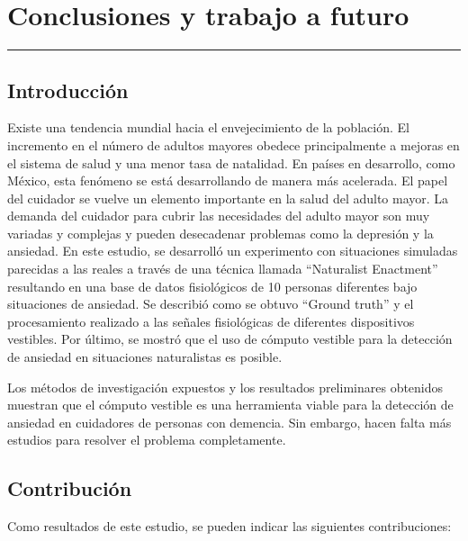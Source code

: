 
\chapter{Conclusiones y trabajo a futuro}\label{capit:cap5}
\vspace{-2.0325ex}%
\noindent
\rule{\textwidth}{0.5pt}
\vspace{-5.5ex}%
\newcommand{\pushline}{\Indp}%

\section{Introducci\'on}
	Existe una tendencia mundial hacia el envejecimiento de la población. El incremento en el n\'umero de adultos mayores obedece principalmente a mejoras en el sistema de salud y una menor tasa de natalidad. En países en desarrollo, como M\'exico, esta fenómeno se está desarrollando de manera más acelerada. El papel del cuidador se vuelve un elemento importante en la salud del adulto mayor. La demanda del cuidador para cubrir las necesidades del adulto mayor son muy variadas y complejas y pueden desecadenar problemas como la depresi\'on y la ansiedad.
En este estudio, se desarroll\'o un experimento con situaciones simuladas parecidas a las reales a trav\'es de una t\'ecnica llamada ``Naturalist Enactment'' resultando en una base de datos fisiol\'ogicos de 10 personas diferentes bajo situaciones de ansiedad. Se describi\'o como se obtuvo ``Ground truth'' y el procesamiento realizado a las se\~nales fisiol\'ogicas de diferentes dispositivos vestibles. Por \'ultimo, se mostr\'o que el uso de c\'omputo vestible para la detecci\'on de ansiedad en situaciones naturalistas es posible.

Los m\'etodos de investigaci\'on expuestos y los resultados preliminares obtenidos muestran que el c\'omputo vestible es una herramienta viable para la detecci\'on de ansiedad en cuidadores de personas con demencia. Sin embargo, hacen falta m\'as estudios para resolver el problema completamente.


\section{Contribuci\'on}
	Como resultados de este estudio, se pueden indicar las siguientes contribuciones:

